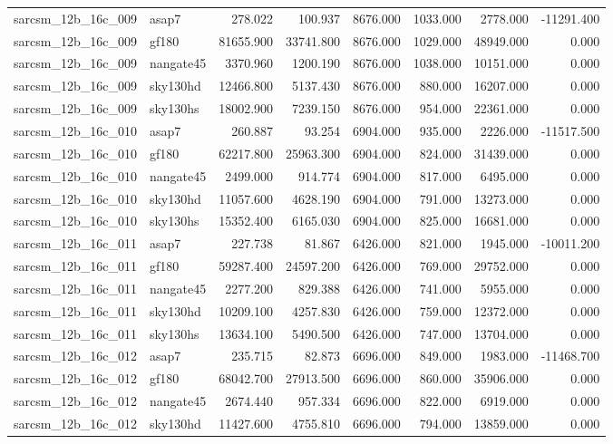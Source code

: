 \begin{tabular}{llrrrrrr}
sarcsm\_12b\_16c\_009 & asap7 & 278.022 & 100.937 & 8676.000 & 1033.000 & 2778.000 & -11291.400 \\
sarcsm\_12b\_16c\_009 & gf180 & 81655.900 & 33741.800 & 8676.000 & 1029.000 & 48949.000 & 0.000 \\
sarcsm\_12b\_16c\_009 & nangate45 & 3370.960 & 1200.190 & 8676.000 & 1038.000 & 10151.000 & 0.000 \\
sarcsm\_12b\_16c\_009 & sky130hd & 12466.800 & 5137.430 & 8676.000 & 880.000 & 16207.000 & 0.000 \\
sarcsm\_12b\_16c\_009 & sky130hs & 18002.900 & 7239.150 & 8676.000 & 954.000 & 22361.000 & 0.000 \\
sarcsm\_12b\_16c\_010 & asap7 & 260.887 & 93.254 & 6904.000 & 935.000 & 2226.000 & -11517.500 \\
sarcsm\_12b\_16c\_010 & gf180 & 62217.800 & 25963.300 & 6904.000 & 824.000 & 31439.000 & 0.000 \\
sarcsm\_12b\_16c\_010 & nangate45 & 2499.000 & 914.774 & 6904.000 & 817.000 & 6495.000 & 0.000 \\
sarcsm\_12b\_16c\_010 & sky130hd & 11057.600 & 4628.190 & 6904.000 & 791.000 & 13273.000 & 0.000 \\
sarcsm\_12b\_16c\_010 & sky130hs & 15352.400 & 6165.030 & 6904.000 & 825.000 & 16681.000 & 0.000 \\
sarcsm\_12b\_16c\_011 & asap7 & 227.738 & 81.867 & 6426.000 & 821.000 & 1945.000 & -10011.200 \\
sarcsm\_12b\_16c\_011 & gf180 & 59287.400 & 24597.200 & 6426.000 & 769.000 & 29752.000 & 0.000 \\
sarcsm\_12b\_16c\_011 & nangate45 & 2277.200 & 829.388 & 6426.000 & 741.000 & 5955.000 & 0.000 \\
sarcsm\_12b\_16c\_011 & sky130hd & 10209.100 & 4257.830 & 6426.000 & 759.000 & 12372.000 & 0.000 \\
sarcsm\_12b\_16c\_011 & sky130hs & 13634.100 & 5490.500 & 6426.000 & 747.000 & 13704.000 & 0.000 \\
sarcsm\_12b\_16c\_012 & asap7 & 235.715 & 82.873 & 6696.000 & 849.000 & 1983.000 & -11468.700 \\
sarcsm\_12b\_16c\_012 & gf180 & 68042.700 & 27913.500 & 6696.000 & 860.000 & 35906.000 & 0.000 \\
sarcsm\_12b\_16c\_012 & nangate45 & 2674.440 & 957.334 & 6696.000 & 822.000 & 6919.000 & 0.000 \\
sarcsm\_12b\_16c\_012 & sky130hd & 11427.600 & 4755.810 & 6696.000 & 794.000 & 13859.000 & 0.000 \\

\end{tabular}
